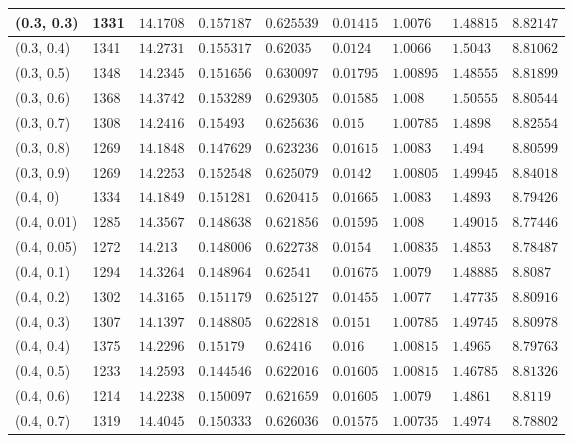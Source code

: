 \begin{center}
{\begin{longtable}{| l | p{} |  p{} | p{} | p{} | p{} | p{} | p{} | p{} |}
 (0.3, 0.3) & 1331  & $14.1708$ & $0.157187$ & $0.625539$ & $0.01415$ & $1.0076$ & $1.48815$ & $8.82147$ \\ \hline
 (0.3, 0.4) & 1341  & $14.2731$ & $0.155317$ & $0.62035$ & $0.0124$ & $1.0066$ & $1.5043$ & $8.81062$ \\ \hline
 (0.3, 0.5) & 1348  & $14.2345$ & $0.151656$ & $0.630097$ & $0.01795$ & $1.00895$ & $1.48555$ & $8.81899$ \\ \hline
 (0.3, 0.6) & 1368  & $14.3742$ & $0.153289$ & $0.629305$ & $0.01585$ & $1.008$ & $1.50555$ & $8.80544$ \\ \hline
 (0.3, 0.7) & 1308  & $14.2416$ & $0.15493$ & $0.625636$ & $0.015$ & $1.00785$ & $1.4898$ & $8.82554$ \\ \hline
 (0.3, 0.8) & 1269  & $14.1848$ & $0.147629$ & $0.623236$ & $0.01615$ & $1.0083$ & $1.494$ & $8.80599$ \\ \hline
 (0.3, 0.9) & 1269  & $14.2253$ & $0.152548$ & $0.625079$ & $0.0142$ & $1.00805$ & $1.49945$ & $8.84018$ \\ \hline
 (0.4, 0) & 1334  & $14.1849$ & $0.151281$ & $0.620415$ & $0.01665$ & $1.0083$ & $1.4893$ & $8.79426$ \\ \hline
 (0.4, 0.01) & 1285  & $14.3567$ & $0.148638$ & $0.621856$ & $0.01595$ & $1.008$ & $1.49015$ & $8.77446$ \\ \hline
 (0.4, 0.05) & 1272  & $14.213$ & $0.148006$ & $0.622738$ & $0.0154$ & $1.00835$ & $1.4853$ & $8.78487$ \\ \hline
 (0.4, 0.1) & 1294  & $14.3264$ & $0.148964$ & $0.62541$ & $0.01675$ & $1.0079$ & $1.48885$ & $8.8087$ \\ \hline
 (0.4, 0.2) & 1302  & $14.3165$ & $0.151179$ & $0.625127$ & $0.01455$ & $1.0077$ & $1.47735$ & $8.80916$ \\ \hline
 (0.4, 0.3) & 1307  & $14.1397$ & $0.148805$ & $0.622818$ & $0.0151$ & $1.00785$ & $1.49745$ & $8.80978$ \\ \hline
 (0.4, 0.4) & 1375  & $14.2296$ & $0.15179$ & $0.62416$ & $0.016$ & $1.00815$ & $1.4965$ & $8.79763$ \\ \hline
 (0.4, 0.5) & 1233  & $14.2593$ & $0.144546$ & $0.622016$ & $0.01605$ & $1.00815$ & $1.46785$ & $8.81326$ \\ \hline
 (0.4, 0.6) & 1214  & $14.2238$ & $0.150097$ & $0.621659$ & $0.01605$ & $1.0079$ & $1.4861$ & $8.8119$ \\ \hline
 (0.4, 0.7) & 1319  & $14.4045$ & $0.150333$ & $0.626036$ & $0.01575$ & $1.00735$ & $1.4974$ & $8.78802$ \\ \hline

\end{longtable}}
\end{center}
